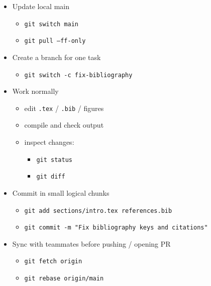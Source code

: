 \documentclass[a4paper,11pt]{article}
\begin{document}
\begin{itemize}
  \renewcommand{\labelitemi}{$\rightarrow$}

  \item Update local main
    \begin{itemize}
      \renewcommand{\labelitemii}{$\triangleright$}
      \item \texttt{git switch main}
      \item \texttt{git pull --ff-only}
    \end{itemize}

  \item Create a branch for one task
    \begin{itemize}
      \renewcommand{\labelitemii}{$\triangleright$}
      \item \texttt{git switch -c fix-bibliography}
    \end{itemize}

  \item Work normally
    \begin{itemize}
      \renewcommand{\labelitemii}{$\triangleright$}
      \item edit \texttt{.tex} / \texttt{.bib} / figures
      \item compile and check output
      \item inspect changes:
        \begin{itemize}
          \item \texttt{git status}
          \item \texttt{git diff}
        \end{itemize}
    \end{itemize}

  \item Commit in small logical chunks
    \begin{itemize}
      \renewcommand{\labelitemii}{$\triangleright$}
      \item \texttt{git add sections/intro.tex references.bib}
      \item \texttt{git commit -m "Fix bibliography keys and citations"}
    \end{itemize}

  \item Sync with teammates before pushing / opening PR
    \begin{itemize}
      \renewcommand{\labelitemii}{$\triangleright$}
      \item \texttt{git fetch origin}
      \item \texttt{git rebase origin/main}
    \end{itemize}


\end{itemize}
\end{document}
